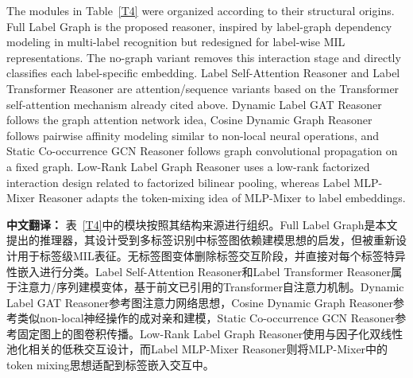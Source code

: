 \documentclass[Afour,sagev,times]{sagej}
\begin{document}
The modules in Table~\ref{T4} were organized according to their structural origins. Full Label Graph is the proposed reasoner, inspired by label-graph dependency modeling in multi-label recognition but redesigned for label-wise MIL representations. The no-graph variant removes this interaction stage and directly classifies each label-specific embedding. Label Self-Attention Reasoner and Label Transformer Reasoner are attention/sequence variants based on the Transformer self-attention mechanism already cited above. Dynamic Label GAT Reasoner follows the graph attention network idea,\cite{R23} Cosine Dynamic Graph Reasoner follows pairwise affinity modeling similar to non-local neural operations,\cite{R24} and Static Co-occurrence GCN Reasoner follows graph convolutional propagation on a fixed graph.\cite{R25} Low-Rank Label Graph Reasoner uses a low-rank factorized interaction design related to factorized bilinear pooling,\cite{R26} whereas Label MLP-Mixer Reasoner adapts the token-mixing idea of MLP-Mixer to label embeddings.\cite{R27}

\textbf{中文翻译：} 表~\ref{T4}中的模块按照其结构来源进行组织。Full Label Graph是本文提出的推理器，其设计受到多标签识别中标签图依赖建模思想的启发，但被重新设计用于标签级MIL表征。无标签图变体删除标签交互阶段，并直接对每个标签特异性嵌入进行分类。Label Self-Attention Reasoner和Label Transformer Reasoner属于注意力/序列建模变体，基于前文已引用的Transformer自注意力机制。Dynamic Label GAT Reasoner参考图注意力网络思想，Cosine Dynamic Graph Reasoner参考类似non-local神经操作的成对亲和建模，Static Co-occurrence GCN Reasoner参考固定图上的图卷积传播。Low-Rank Label Graph Reasoner使用与因子化双线性池化相关的低秩交互设计，而Label MLP-Mixer Reasoner则将MLP-Mixer中的token mixing思想适配到标签嵌入交互中。
\end{document}

